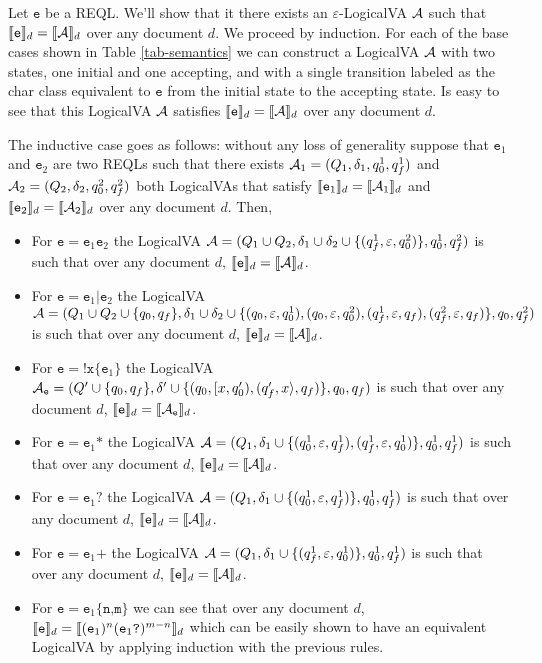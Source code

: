 Let $\texttt{e}$ be a REQL. We'll show that it there exists an $\varepsilon$-LogicalVA $\mathcal{A}$ such that $\llbracket\texttt{e}\rrbracket_d = \llbracket\mathcal{A}\rrbracket_d$ over any document $d$.  We proceed by induction. For each of the base cases shown in Table \ref*{tab-semantics} we can construct a LogicalVA $\mathcal{A}$ with two states, one initial and one accepting, and with a single transition labeled as the char class equivalent to $\texttt{e}$ from the initial state to the accepting state. Is easy to see that this LogicalVA $\mathcal{A}$ satisfies $\llbracket\texttt{e}\rrbracket_d = \llbracket\mathcal{A}\rrbracket_d$ over any document $d$.

The inductive case goes as follows: without any loss of generality suppose that $\texttt{e}_1$ and $\texttt{e}_2$ are two REQLs such that there exists $\mathcal{A}_1 = (Q_1, \delta_1, q_0^1, q_f^1)$ and $\mathcal{A}_2 = (Q_2, \delta_2, q_0^2, q_f^2)$ both LogicalVAs that satisfy $\llbracket\texttt{e}_1\rrbracket_d = \llbracket\mathcal{A}_1\rrbracket_d$ and  $\llbracket\texttt{e}_2\rrbracket_d = \llbracket\mathcal{A}_2\rrbracket_d$ over any document $d$. Then, 

\begin{itemize}
    \item For $\texttt{e} = \texttt{e}_1\texttt{e}_2$ the LogicalVA $\mathcal{A} = (Q_1 \cup Q_2, \delta_1 \cup \delta_2 \cup \{(q_f^1, \varepsilon, q_0^2)\}, q_0^1, q_f^2)$ is such that over any document $d$, $\llbracket\texttt{e}\rrbracket_d = \llbracket\mathcal{A}\rrbracket_d$.
    \item For $\texttt{e} = \texttt{e}_1\texttt{|}\texttt{e}_2$ the LogicalVA $\mathcal{A} = (Q_1 \cup Q_2 \cup \{q_0, q_f\}, \delta_1 \cup \delta_2 \cup \{(q_0, \varepsilon, q_0^1), (q_0, \varepsilon, q_0^2), (q_f^1, \varepsilon, q_f), (q_f^2, \varepsilon, q_f) \}, q_0, q_f^2)$ is such that over any document $d$, $\llbracket\texttt{e}\rrbracket_d = \llbracket\mathcal{A}\rrbracket_d$.
    \item For $\texttt{e} = \texttt{!x\{}\texttt{e}_1\texttt{\}}$ the LogicalVA $\mathcal{A}_\texttt{e} = (Q' \cup \{q_0, q_f\}, \delta' \cup \{(q_0, [x, q_0'), (q_f', x\rangle, q_f)\}, q_0, q_f)$ is such that over any document $d$, $\llbracket\texttt{e}\rrbracket_d = \llbracket\mathcal{A}_\texttt{e}\rrbracket_d$.
    \item For $\texttt{e} = \texttt{e}_1\texttt{*}$ the LogicalVA $\mathcal{A} = (Q_1, \delta_1 \cup \{(q_0^1, \varepsilon, q_f^1), (q_f^1, \varepsilon, q_0^1)\}, q_0^1, q_f^1)$ is such that over any document $d$, $\llbracket\texttt{e}\rrbracket_d = \llbracket\mathcal{A}\rrbracket_d$.
    \item For $\texttt{e} = \texttt{e}_1\texttt{?}$ the LogicalVA $\mathcal{A} = (Q_1, \delta_1 \cup \{(q_0^1, \varepsilon, q_f^1)\}, q_0^1, q_f^1)$ is such that over any document $d$, $\llbracket\texttt{e}\rrbracket_d = \llbracket\mathcal{A}\rrbracket_d$.
    \item For $\texttt{e} = \texttt{e}_1\texttt{+}$ the LogicalVA $\mathcal{A} = (Q_1, \delta_1 \cup \{(q_f^1, \varepsilon, q_0^1)\}, q_0^1, q_f^1)$ is such that over any document $d$, $\llbracket\texttt{e}\rrbracket_d = \llbracket\mathcal{A}\rrbracket_d$.
    \item For $\texttt{e} = \texttt{e}_1\texttt{\{n,m\}}$ we can see that over any document $d$, $\llbracket\texttt{e}\rrbracket_d = \llbracket(\texttt{e}_1)^n(\texttt{e}_1\texttt{?})^{m-n}\rrbracket_d$ which can be easily shown to have an equivalent LogicalVA by applying induction with the previous rules.
\end{itemize}